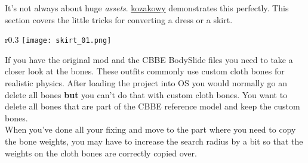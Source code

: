 It's not always about huge \textit{assets}. \href{https://www.nexusmods.com/users/11770218?tab=user+files}{kozakowy} demonstrates this
perfectly. This section covers the little tricks for converting a dress or a skirt.
\begin{wrapfigure}[10]{r}{0.3\textwidth}
    \vspace{-12pt}
    \texttt{[image: skirt\_01.png]}
\end{wrapfigure}
If you have the original mod and the CBBE BodySlide files you need to take a closer look at the bones. These outfits commonly use 
custom cloth bones for realistic physics. After loading the project into OS you would normally go an delete all bones \textbf{but} 
you can't do that with custom cloth bones. You want to delete all bones that are part of the CBBE reference model and keep the 
custom bones.\\
When you've done all your fixing and move to the part where you need to copy the bone weights, you may have to increase the search 
radius by a bit so that the weights on the cloth bones are correctly copied over.